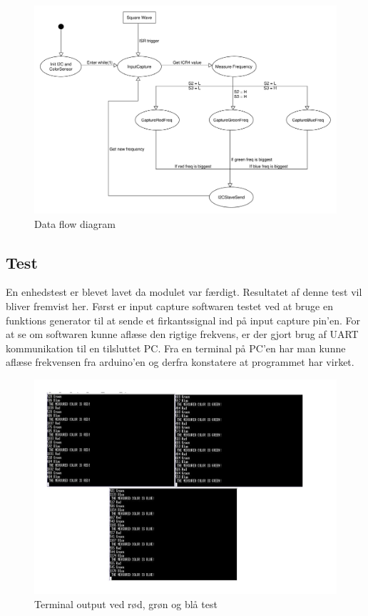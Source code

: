 \begin{figure}[H]
	\centering
	\includegraphics[width = 500pt]{Img/DataFlowDiagram.pdf}
	\caption{Data flow diagram}
	\label{fig:DataFlow}
\end{figure}


\subsection{Test}
En enhedstest er blevet lavet da modulet var færdigt. Resultatet af denne test vil bliver fremvist her. Først er input capture softwaren testet ved at bruge en funktions generator til at sende et firkantssignal ind på input capture pin'en. For at se om softwaren kunne aflæse den rigtige frekvens, er der gjort brug af UART kommunikation til en tilsluttet PC. Fra en terminal på PC'en har man kunne aflæse frekvensen fra arduino'en og derfra konstatere at programmet har virket.

\begin{figure}[H]
	\centering
	\includegraphics[width = 450pt]{Img/Test_all.pdf}
	\caption{Terminal output ved rød, grøn og blå test}
	\label{fig:Test_all}
\end{figure}

